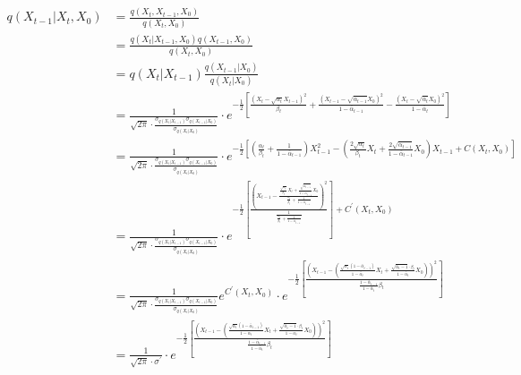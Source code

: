 \documentclass[12pt,a4paper,UTF8]{article}
\begin{document}
\[\begin{aligned}
q\left(X_{t-1}|X_t,X_0\right)&=\frac{q\left(X_t,X_{t-1},X_0\right)}{q\left(X_t,X_0\right)}\\
&=\frac{q\left(X_t|X_{t-1},X_0\right)q\left(X_{t-1},X_0\right)}{q\left(X_t,X_0\right)}\\
&=q\left(X_t|X_{t-1}\right)\frac{q\left(X_{t-1}|X_0\right)}{q\left(X_t|X_0\right)}\\
&=\frac{1}{\sqrt{2\pi}\cdot\frac{\sigma_{q\left(X_t|X_{t-1}\right)}\sigma_{q\left(X_{t-1}|X_0\right)}}{\sigma_{q\left(X_t|X_0\right)}}}\cdot e^{-\frac{1}{2}\left[\frac{\left(X_t-\sqrt{\alpha_t}X_{t-1}\right)^2}{\beta_t}+\frac{\left(X_{t-1}-\sqrt{\bar{\alpha}_{t-1}}X_0\right)^2}{1-\bar{\alpha}_{t-1}}-\frac{\left(X_t-\sqrt{\bar{\alpha}_t}X_0\right)^2}{1-\bar{\alpha}_t}\right]}\\
&=\frac{1}{\sqrt{2\pi}\cdot\frac{\sigma_{q\left(X_t|X_{t-1}\right)}\sigma_{q\left(X_{t-1}|X_0\right)}}{\sigma_{q\left(X_t|X_0\right)}}}\cdot e^{-\frac{1}{2}\left[\left(\frac{\alpha_t}{\beta_t}+\frac{1}{1-\bar{\alpha}_{t-1}}\right)X_{t-1}^2-\left(\frac{2\sqrt{\alpha_t}}{\beta_t}X_t+\frac{2\sqrt{\bar{\alpha}_{t-1}}}{1-\bar{\alpha}_{t-1}}X_0\right)X_{t-1}+C\left(X_t,X_0\right)\right]}\\
&=\frac{1}{\sqrt{2\pi}\cdot\frac{\sigma_{q\left(X_t|X_{t-1}\right)}\sigma_{q\left(X_{t-1}|X_0\right)}}{\sigma_{q\left(X_t|X_0\right)}}}\cdot e^{-\frac{1}{2}\left[\frac{\left(X_{t-1}-\frac{\frac{\sqrt{\alpha_t}}{\beta_t}X_t+\frac{\sqrt{\bar{\alpha}_{t-1}}}{1-\bar{\alpha}_{t-1}}X_0}{\frac{\alpha_t}{\beta_t}+\frac{1}{1-\bar{\alpha}_{t-1}}}\right)^2}{\frac{1}{\frac{\alpha_t}{\beta_t}+\frac{1}{1-\bar{\alpha}_{t-1}}}}\right]+C^{\prime}\left(X_t,X_0\right)}\\
&=\frac{1}{\sqrt{2\pi}\cdot\frac{\sigma_{q\left(X_t|X_{t-1}\right)}\sigma_{q\left(X_{t-1}|X_0\right)}}{\sigma_{q\left(X_t|X_0\right)}}}e^{C^{\prime}\left(X_t,X_0\right)}\cdot e^{-\frac{1}{2}\left[\frac{\left(X_{t-1}-\left(\frac{\sqrt{\alpha_t}\left(1-\bar{\alpha}_{t-1}\right)}{1-\bar{\alpha}_t}X_t+\frac{\sqrt{\bar{\alpha}_t-1}\cdot\beta_t}{1-\bar{\alpha}_t}X_0\right)\right)^2}{\frac{1-\bar{\alpha}_{t-1}}{1-\bar{\alpha}_t}\beta_t}\right]}\\
&=\frac{1}{\sqrt{2\pi}\cdot\sigma^{\prime}}\cdot e^{-\frac{1}{2}\left[\frac{\left(X_{t-1}-\left(\frac{\sqrt{\alpha_t}\left(1-\bar{\alpha}_{t-1}\right)}{1-\bar{\alpha}_t}X_t+\frac{\sqrt{\bar{\alpha}_t-1}\cdot\beta_t}{1-\bar{\alpha}_t}X_0\right)\right)^2}{\frac{1-\bar{\alpha}_{t-1}}{1-\bar{\alpha}_t}\beta_t}\right]}\\
\end{aligned}\]
\end{document}
